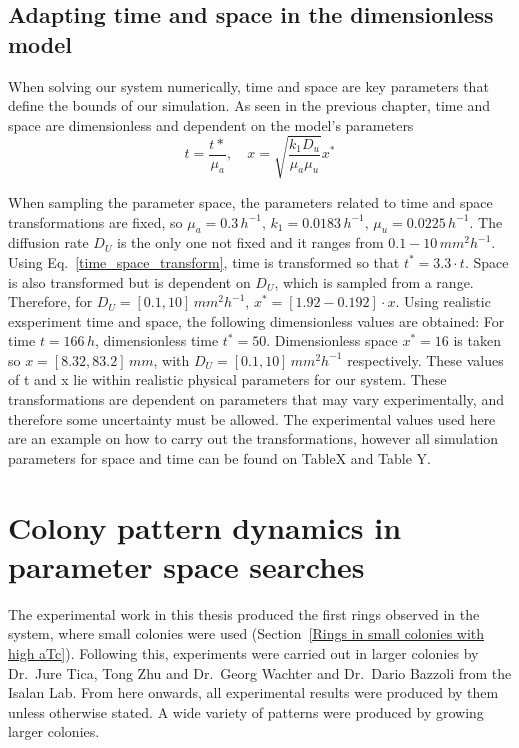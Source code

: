 \subsection{Adapting time and space in the dimensionless model}
When solving our system numerically, time and space are key parameters that define the bounds of our simulation.
As seen in the previous chapter, time and space are dimensionless and dependent on the model’s parameters
\begin{equation}\label{time_space_transform}
    t = \frac{t*}{\mu _a}, \quad x = \sqrt{\frac{k_{1}D_{u}}{\mu_{a}\mu_{u}}}x^*
\end{equation}

When sampling the parameter space, the parameters related to time and space transformations are fixed, so $\mu_a = 0.3 \,h^{-1}, \,k_1 = 0.0183 \,h^{-1},\, \mu_u = 0.0225\, h^{-1}$.
The diffusion rate $D_U$ is the only one not fixed and it ranges from $0.1-10 \,mm^2h^{-1}$.
Using Eq.~\ref{time_space_transform}, time is transformed so that $t^*=3.3\cdot t$.
Space is also transformed but is dependent on $D_U$, which is sampled from a range.
Therefore, for $D_U = [0.1, 10] \,mm^2 h^{-1}$, $x^* =[1.92 - 0.192] \cdot x$.
Using realistic exsperiment time and space, the following dimensionless values are obtained:
For time $t=166\,h$, dimensionless time $t^*=50$.
Dimensionless space  $x^*=16$ is taken so  $x = [8.32, 83.2] \,mm$, with $D_U = [0.1, 10]\, mm^2 h^{-1}$ respectively.
These values of t and x lie within realistic physical parameters for our system.
These transformations are dependent on parameters that may vary experimentally, and therefore some uncertainty must be allowed.
The experimental values used here are an example on how to carry out the transformations, however all simulation parameters for space and time can be found on TableX and Table Y.

\section{Colony pattern dynamics in parameter space searches}

The experimental work in this thesis produced the first rings observed in the system, where small colonies were used (Section~\ref{Rings in small colonies with high aTc}).
Following this, experiments were carried out in larger colonies by Dr.~Jure Tica, Tong Zhu and Dr.~Georg Wachter and Dr.~Dario Bazzoli from the Isalan Lab.
From here onwards, all experimental results were produced by them unless otherwise stated.
A wide variety of patterns were produced by growing larger colonies.


